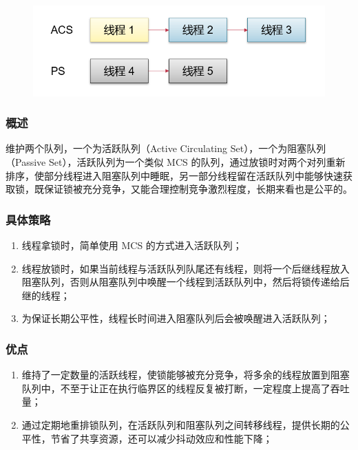 \documentclass[UTF8]{ctexart}
\begin{document}
\begin{figure}[ht]
\centering
\includegraphics[scale=0.5]{images/img1.png}
\end{figure}

\subsubsection{概述}

维护两个队列，一个为活跃队列（Active Circulating Set），一个为阻塞队列（Passive Set），活跃队列为一个类似 MCS 的队列，通过放锁时对两个对列重新排序，使部分线程进入阻塞队列中睡眠，另一部分线程留在活跃队列中能够快速获取锁，既保证锁被充分竞争，又能合理控制竞争激烈程度，长期来看也是公平的。

\subsubsection{具体策略}

\begin{enumerate}
    \item 线程拿锁时，简单使用 MCS 的方式进入活跃队列；
    \item 线程放锁时，如果当前线程与活跃队列队尾还有线程，则将一个后继线程放入阻塞队列，否则从阻塞队列中唤醒一个线程到活跃队列中，然后将锁传递给后继的线程；
    \item 为保证长期公平性，线程长时间进入阻塞队列后会被唤醒进入活跃队列；
\end{enumerate}

\subsubsection{优点}
\begin{enumerate}
    \item 维持了一定数量的活跃线程，使锁能够被充分竞争，将多余的线程放置到阻塞队列中，不至于让正在执行临界区的线程反复被打断，一定程度上提高了吞吐量；
    \item 通过定期地重排锁队列，在活跃队列和阻塞队列之间转移线程，提供长期的公平性，节省了共享资源，还可以减少抖动效应和性能下降；
\end{enumerate}
\end{document}
